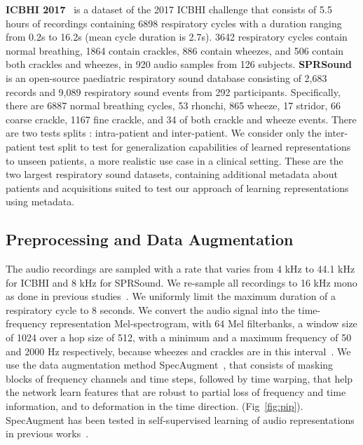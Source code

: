 \documentclass{article}
\begin{document}
\begin{sloppy}
{\bf ICBHI 2017}~\cite{rocha2019open} is a dataset of the 2017 ICBHI challenge that consists of 5.5 hours of recordings containing 6898 respiratory cycles with a duration ranging from 0.2s to 16.2s (mean cycle duration is 2.7s). 3642 respiratory cycles contain normal breathing, 1864 contain crackles, 886 contain wheezes, and 506 contain both crackles and wheezes, in 920 audio samples from 126 subjects. {\bf SPRSound}~\cite{SPRSound} is an open-source paediatric respiratory sound database consisting of 2,683 records and 9,089 respiratory sound events from 292 participants. Specifically, there are 6887 normal breathing cycles, 53 rhonchi, 865 wheeze, 17 stridor, 66 coarse crackle, 1167 fine crackle, and 34 of both crackle and wheeze events. There are two tests splits : intra-patient and inter-patient. We consider only the inter-patient test split to test for generalization capabilities of learned representations to unseen patients, a more realistic use case in a clinical setting. These are the two largest respiratory sound datasets, containing additional metadata about patients and acquisitions suited to test our approach of learning representations using metadata.

\subsection{Preprocessing and Data Augmentation}
\label{ssec:preprocess_da}

The audio recordings are sampled with a rate that varies from 4 kHz to 44.1 kHz for ICBHI and 8 kHz for SPRSound. We re-sample all recordings to 16 kHz mono as done in previous studies~\cite{9414385,9729496}. We uniformly limit the maximum duration of a respiratory cycle to 8 seconds. We convert the audio signal into the time-frequency representation Mel-spectrogram, with 64 Mel filterbanks, a window size of 1024 over a hop size of 512, with a minimum and a maximum frequency of 50 and 2000 Hz respectively, because wheezes and crackles are in this interval~\cite{10.1007/978-981-10-7419-6_7}. We use the data augmentation method SpecAugment~\cite{park19e_interspeech}, that consists of masking blocks of frequency channels and time steps, followed by time warping, that help the network learn features that are robust to partial loss of frequency and time information, and to deformation in the time direction. (Fig~\ref{fig:pip}). SpecAugment has been tested in self-supervised learning of audio representations in previous works~\cite{fonseca2021unsupervised}.


\end{sloppy}
\end{document}
